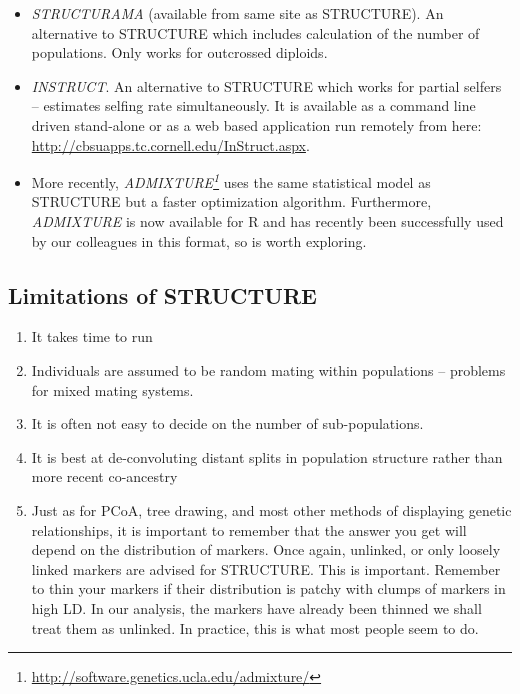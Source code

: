 \documentclass[
]{book}
\renewcommand{\href}[2]{#2\footnote{\url{#1}}}
\begin{document}
\begin{itemize}
\item
  \emph{STRUCTURAMA} (available from same site as STRUCTURE). An alternative to STRUCTURE which includes calculation of the number of populations. Only works for outcrossed diploids.
\item
  \emph{INSTRUCT}. An alternative to STRUCTURE which works for partial selfers -- estimates selfing rate simultaneously. It is available as a command line driven stand-alone or as a web based application run remotely from here: \url{http://cbsuapps.tc.cornell.edu/InStruct.aspx}.
\item
  More recently, \emph{\href{http://software.genetics.ucla.edu/admixture/}{ADMIXTURE}} uses the same statistical model as STRUCTURE but a faster optimization algorithm. Furthermore, \emph{ADMIXTURE} is now available for R and has recently been successfully used by our colleagues in this format, so is worth exploring.
\end{itemize}

\hypertarget{limitations-of-structure}{%
\subsection{Limitations of STRUCTURE}\label{limitations-of-structure}}

\begin{enumerate}
\def\labelenumi{\arabic{enumi}.}
\item
  It takes time to run
\item
  Individuals are assumed to be random mating within populations -- problems for mixed mating systems.
\item
  It is often not easy to decide on the number of sub-populations.
\item
  It is best at de-convoluting distant splits in population structure rather than more recent co-ancestry
\item
  Just as for PCoA, tree drawing, and most other methods of displaying genetic relationships, it is important to remember that the answer you get will depend on the distribution of markers. Once again, unlinked, or only loosely linked markers are advised for STRUCTURE. This is important. Remember to thin your markers if their distribution is patchy with clumps of markers in high LD. In our analysis, the markers have already been thinned we shall treat them as unlinked. In practice, this is what most people seem to do.
\end{enumerate}
\end{document}
